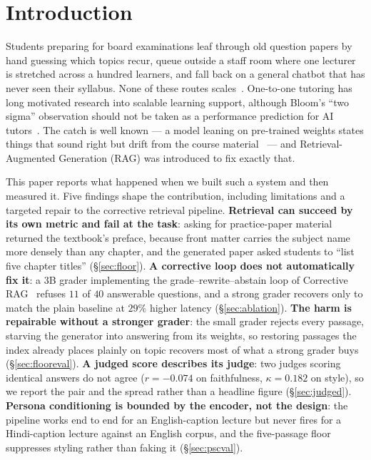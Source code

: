 \documentclass[conference]{IEEEtran}
\begin{document}
\section{Introduction}
Students preparing for board examinations leaf through old question papers by
hand guessing which topics recur, queue outside a staff room where one lecturer
is stretched across a hundred learners, and fall back on a general chatbot that
has never seen their syllabus. None of these routes scales~\cite{lauber2025}.
One-to-one tutoring has long motivated research into scalable learning support,
although Bloom's ``two sigma'' observation should not be taken as a performance
prediction for AI tutors~\cite{bloom1984,vanlehn2011}. The catch is well known
--- a model leaning on pre-trained weights states things that sound right but
drift from the course material~\cite{lewis2020} --- and Retrieval-Augmented
Generation (RAG) was introduced to fix exactly that.

This paper reports what happened when we built such a system and then measured
it. Five findings shape the contribution, including limitations and a targeted
repair to the corrective retrieval pipeline.
\textbf{Retrieval can succeed by its own metric and fail at the task}: asking
for practice-paper material returned the textbook's preface, because front
matter carries the subject name more densely than any chapter, and the
generated paper asked students to ``list five chapter titles''
(§\ref{sec:floor}). \textbf{A corrective loop does not automatically fix it}:
a $3$B grader implementing the grade--rewrite--abstain loop of Corrective
RAG~\cite{yan2024crag} refuses $11$ of $40$ answerable questions, and a strong
grader recovers only to match the plain baseline at $29\%$ higher latency
(§\ref{sec:ablation}). \textbf{The harm is repairable without a stronger
grader}: the small grader rejects every passage, starving the generator into
answering from its weights, so restoring passages the index already places
plainly on topic recovers most of what a strong grader buys
(§\ref{sec:flooreval}). \textbf{A judged score describes its judge}: two judges
scoring identical answers do not agree ($r = -0.074$ on faithfulness,
$\kappa = 0.182$ on style), so we report the pair and the spread rather than a
headline figure (§\ref{sec:judged}). \textbf{Persona conditioning is bounded by
the encoder, not the design}: the pipeline works end to end for an
English-caption lecture but never fires for a Hindi-caption lecture against an
English corpus, and the five-passage floor suppresses styling rather than
faking it (§\ref{sec:pscval}).
\end{document}
